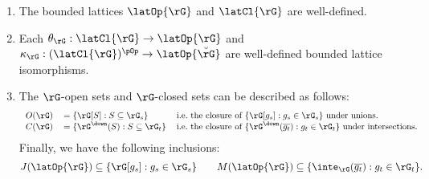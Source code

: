 \documentclass{article}
\begin{document}
\begin{lemma}
\label{lem:lat_op_cl}
\item
\begin{enumerate}
\item
The bounded lattices $\latOp{\rG}$ and $\latCl{\rG}$ are well-defined.
\item
Each $\theta_\rG : \latCl{\rG} \to \latOp{\rG}$ and $\kappa_\rG : (\latCl{\rG})^{\pOp} \to \latOp{\breve{\rG}}$ are well-defined bounded lattice isomorphisms.

\item
The $\rG$-open sets and $\rG$-closed sets can be described as follows:
\[
\begin{tabular}{lll}
$O(\rG)$ & $= \{ \rG[S] : S \subseteq \rG_s \}$
& i.e.\ the closure of $\{ \rG[g_s] : g_s \in \rG_s \}$ under unions.
\\
$C(\rG)$ & $= \{ \rG^\down(S) : S \subseteq \rG_t \}$
& i.e.\ the closure of $\{ \rG^\down(\overline{g_t}) : g_t \in \rG_t \}$ under intersections.
\end{tabular}
\]
Finally, we have the following inclusions:
\[
J(\latOp{\rG}) \subseteq \{ \rG[g_s] : g_s \in \rG_s \}
\qquad
M(\latOp{\rG}) \subseteq \{ \inte_\rG(\overline{g_t}) : g_t \in \rG_t \}.
\]
\end{enumerate}
\end{lemma}
\end{document}
